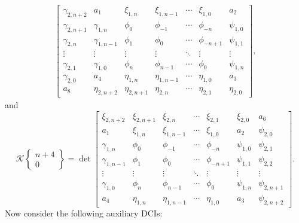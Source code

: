 \documentclass[pdftex]{sigma}
\numberwithin{equation}{section}
\newcommand{\ga}{\gamma}
\begin{document}
\begin{gather*}
\begin{bmatrix}
				\ga_{2,n+2} &	a_1 & \xi_{1,n} & \xi_{1,n-1} & \cdots & \xi_{1,0} & a_2 \\
				\ga_{2,n+1} &	\ga_{1,n} &	\phi_0& \phi_{-1} & \cdots & \phi_{-n} & \psi_{1,0} \\
				\ga_{2,n} &	\ga_{1,n-1} &	\phi_{1}& \phi_0 & \cdots & \phi_{-n+1} & \psi_{1,1} \\
				\vdots &	\vdots & \vdots & \vdots & \ddots & \vdots & \vdots \\
				\ga_{2,1} &	\ga_{1,0} &	\phi_{n} & \phi_{n-1} & \cdots & \phi_{0} & \psi_{1,n} \\
				\ga_{2,0} &	a_4 &	\eta_{1,n} & \eta_{1,n-1} & \cdots & \eta_{1,0} & a_3 \\
				a_8 &	\eta_{2,n+2} &	\eta_{2,n+1} & \eta_{2,n} & \cdots & \eta_{2,1} & \eta_{2,0}
			\end{bmatrix},
		\end{gather*}
		and
		\begin{equation*}
			\mathscr{K}\left\lbrace \begin{matrix} n+4 \\ 0 \end{matrix} \right\rbrace	= \det \begin{bmatrix}
				\xi_{2,n+2} & \xi_{2,n+1} & \xi_{2,n} & \cdots & \xi_{2,1} & \xi_{2,0} & a_6 \\
				a_1 & \xi_{1,n} & \xi_{1,n-1} & \cdots & \xi_{1,0} & a_2 & \psi_{2,0} \\
				\ga_{1,n} &	\phi_0& \phi_{-1} & \cdots & \phi_{-n} & \psi_{1,0} & \psi_{2,1} \\
				\ga_{1,n-1} &	\phi_{1}& \phi_0 & \cdots & \phi_{-n+1} & \psi_{1,1} & \psi_{2,2} \\
				\vdots & \vdots & \vdots & \ddots & \vdots & \vdots & \vdots \\
				\ga_{1,0} &	\phi_{n} & \phi_{n-1} & \cdots & \phi_{0} & \psi_{1,n} & \psi_{2,n+1} \\
				a_4 &	\eta_{1,n} & \eta_{1,n-1} & \cdots & \eta_{1,0} & a_3 & \psi_{2,n+2} 			\end{bmatrix}.
		\end{equation*}
		Now consider the following auxiliary DCIs:
\end{document}
